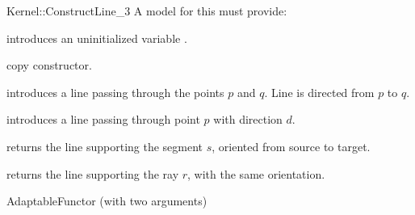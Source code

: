 \begin{ccRefFunctionObjectConcept}{Kernel::ConstructLine_3}
A model for this must provide:


\ccHidden {}
             {introduces an uninitialized variable .}

\ccHidden {}
            {copy constructor.}

            {introduces a line  passing through the points $p$ and $q$. 
             Line  is directed from $p$ to $q$.}


            {introduces a line  passing through point $p$ with 
             direction $d$.}

            {returns the line supporting the segment $s$,
            oriented from source to target.}

            {returns the line supporting the ray $r$, with the
            same orientation.}

\ccRefines
AdaptableFunctor (with two arguments)

\ccSeeAlso
{}  \\

\end{ccRefFunctionObjectConcept}
